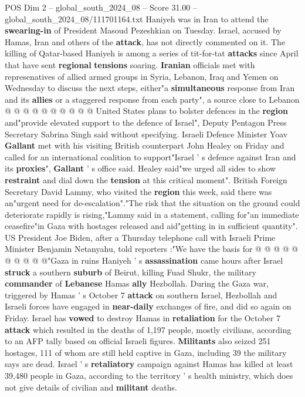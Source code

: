 \begin{textsample}{POS Dim 2 – global\_south\_2024\_08 – Score 31.00 – global\_south\_2024\_08/111701164.txt}
Haniyeh was in Iran to attend the \textbf{swearing-in} of President Masoud Pezeshkian on Tuesday.
Israel, accused by Hamas, Iran and others of the \textbf{attack}, has not directly commented on it.
The killing of Qatar-based Haniyeh is among a series of tit-for-tat \textbf{attacks} since April that have sent \textbf{regional} \textbf{tensions} soaring. \textbf{Iranian} officials met with represenatives of allied armed groups in Syria, Lebanon, Iraq and Yemen on Wednesday to discuss the next steps, either"a \textbf{simultaneous} response from Iran and its \textbf{allies} or a staggered response from each party", a source close to Lebanon @ @ @ @ @ @ @ @ @ @ United States plans to bolster defences in the \textbf{region} and"provide elevated support to the defence of Israel", Deputy Pentagon Press Secretary Sabrina Singh said without specifying.
Israeli Defence Minister Yoav \textbf{Gallant} met with his visiting British counterpart John Healey on Friday and called for an international coalition to support"Israel ' s defence against Iran and its \textbf{proxies}", \textbf{Gallant} ' s office said.
Healey said"we urged all sides to show \textbf{restraint} and dial down the \textbf{tension} at this critical moment".
British Foreign Secretary David Lammy, who visited the \textbf{region} this week, said there was an"urgent need for de-escalation"."The risk that the situation on the ground could deteriorate rapidly is rising,"Lammy said in a statement, calling for"an immediate ceasefire"in Gaza with hostages released and aid"getting in in sufficient quantity".
US President Joe Biden, after a Thursday telephone call with Israeli Prime Minister Benjamin Netanyahu, told reporters :"We have the basis for @ @ @ @ @ @ @ @ @ @"Gaza in ruins Haniyeh ' s \textbf{assassination} came hours after Israel \textbf{struck} a southern \textbf{suburb} of Beirut, killing Fuad Shukr, the military \textbf{commander} of \textbf{Lebanese} Hamas \textbf{ally} Hezbollah.
During the Gaza war, triggered by Hamas ' s October 7 \textbf{attack} on southern Israel, Hezbollah and Israeli forces have engaged in \textbf{near-daily} exchanges of fire, and did so again on Friday.
Israel has \textbf{vowed} to destroy Hamas in \textbf{retaliation} for the October 7 \textbf{attack} which resulted in the deaths of 1,197 people, mostly civilians, according to an AFP tally based on official Israeli figures. \textbf{Militants} also seized 251 hostages, 111 of whom are still held captive in Gaza, including 39 the military says are dead.
Israel ' s \textbf{retaliatory} campaign against Hamas has killed at least 39,480 people in Gaza, according to the territory ' s health ministry, which does not give details of civilian and \textbf{militant} deaths.

\end{textsample}
